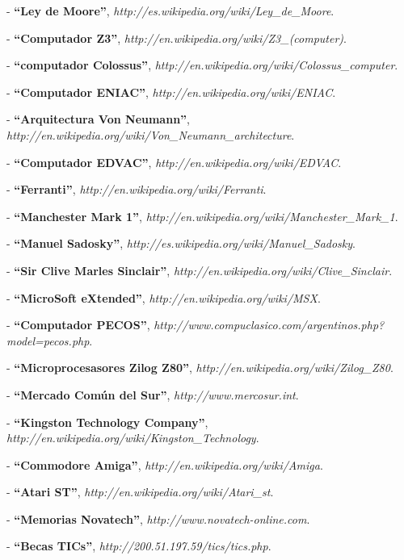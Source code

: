 \documentclass[%
  	final,
%
	notitlepage,
	narroweqnarray,
	inline,
 	twoside,
	]{ieee}
\newcommand{\link}[1]{\textit{#1}}
\newcommand{\ibiblio}[3]{
	\uppercase{#1} - \textbf{``#2''}, \link{#3}.
}
\begin{document}
\begin{thebibliography}{1}
\begin{quote} \end{quote}
 \ibiblio{}{Ley de Moore}{http://es.wikipedia.org/wiki/Ley\_de\_Moore}
 \ibiblio{}{Computador Z3}{http://en.wikipedia.org/wiki/Z3\_(computer)}
\ibiblio{}{computador Colossus}{http://en.wikipedia.org/wiki/Colossus\_computer}
 \ibiblio{}{Computador ENIAC}{http://en.wikipedia.org/wiki/ENIAC}
 \ibiblio{}{Arquitectura Von Neumann}{http://en.wikipedia.org/wiki/Von\_Neumann\_architecture}
 \ibiblio{}{Computador EDVAC}{http://en.wikipedia.org/wiki/EDVAC}
 \ibiblio{}{Ferranti}{http://en.wikipedia.org/wiki/Ferranti}
 \ibiblio{}{Manchester Mark 1}{http://en.wikipedia.org/wiki/Manchester\_Mark\_1}
 \ibiblio{}{Manuel Sadosky}{http://es.wikipedia.org/wiki/Manuel\_Sadosky}
 \ibiblio{}{Sir Clive Marles Sinclair}{http://en.wikipedia.org/wiki/Clive\_Sinclair}
 \ibiblio{}{MicroSoft eXtended}{http://en.wikipedia.org/wiki/MSX}
 \ibiblio{}{Computador PECOS}{http://www.compuclasico.com/argentinos.php?model=pecos.php}
 \ibiblio{}{Microprocesasores Zilog Z80}{http://en.wikipedia.org/wiki/Zilog\_Z80}
 \ibiblio{}{Mercado Com\'un del Sur}{http://www.mercosur.int}
 \ibiblio{}{Kingston Technology Company}{http://en.wikipedia.org/wiki/Kingston\_Technology}
 \ibiblio{}{Commodore Amiga}{http://en.wikipedia.org/wiki/Amiga}
 \ibiblio{}{Atari ST}{http://en.wikipedia.org/wiki/Atari\_st}
\ibiblio{}{Memorias Novatech}{http://www.novatech-online.com}
 \ibiblio{}{Becas TICs}{http://200.51.197.59/tics/tics.php}
\end{thebibliography}

\end{document}
